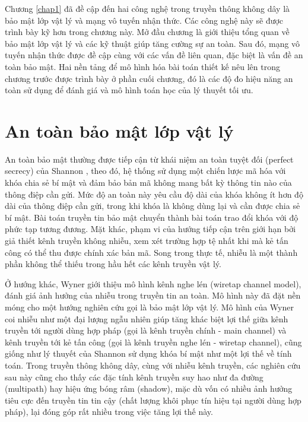 \documentclass[../main.tex]{subfiles}
\begin{document}
\label{chap2}

Chương \ref{chap1} đã đề cập đến hai công nghệ trong truyền thông không dây là bảo mật lớp vật lý và mạng vô tuyến nhận thức. Các công nghệ này sẽ được trình bày kỹ hơn trong chương này. Mở đầu chương là giới thiệu tổng quan về bảo mật lớp vật lý và các kỹ thuật giúp tăng cường sự an toàn. Sau đó, mạng vô tuyến nhận thức được đề cập cùng với các vấn đề liên quan, đặc biệt là vấn đề an toàn bảo mật. Hai nền tảng để mô hình hóa bài toán thiết kế nêu lên trong chương trước được trình bày ở phần cuối chương, đó là các độ đo hiệu năng an toàn sử dụng để đánh giá và mô hình toán học của lý thuyết tối ưu.

\section{An toàn bảo mật lớp vật lý}

An toàn bảo mật thường được tiếp cận từ khái niệm an toàn tuyệt đối (perfect secrecy) của Shannon \cite{shannon}, theo đó, hệ thống sử dụng một chiến lược mã hóa với khóa chia sẻ bí mật và đảm bảo bản mã không mang bất kỳ thông tin nào của thông điệp cần gửi. Mức độ an toàn này yêu cầu độ dài của khóa không ít hơn độ dài của thông điệp cần gửi, trong khi khóa là không dùng lại và cần được chia sẻ bí mật. Bài toán truyền tin bảo mật chuyển thành bài toán trao đổi khóa với độ phức tạp tương đương. Mặt khác, phạm vi của hướng tiếp cận trên giới hạn bởi giả thiết kênh truyền không nhiễu, xem xét trường hợp tệ nhất khi mà kẻ tấn công có thể thu được chính xác bản mã. Song trong thực tế, nhiễu là một thành phần không thể thiếu trong hầu hết các kênh truyền vật lý.

Ở hướng khác, Wyner \cite{wyner} giới thiệu mô hình kênh nghe lén (wiretap channel model), đánh giá ảnh hưởng của nhiễu trong truyền tin an toàn. Mô hình này đã đặt nền móng cho một hướng nghiên cứu gọi là bảo mật lớp vật lý. Mô hình của Wyner coi nhiễu như một đại lượng ngẫu nhiên giúp tăng khác biệt lợi thế giữa kênh truyền tới người dùng hợp pháp (gọi là kênh truyền chính - main channel) và kênh truyền tới kẻ tấn công (gọi là kênh truyền nghe lén - wiretap channel), cũng giống như lý thuyết của Shannon sử dụng khóa bí mật như một lợi thế về tính toán. Trong truyền thông không dây, cùng với nhiễu kênh truyền, các nghiên cứu sau này \cite{liang2008secure,barros2006secrecy,mukherjee2013fading,liang2013broadcast,tang2014secrecy,lin2015fast,lei2015physical} cũng cho thấy các đặc tính kênh truyền suy hao như đa đường (multipath) hay hiệu ứng bóng râm (shadow), mặc dù vốn có nhiều ảnh hưởng tiêu cực đến truyền tin tin cậy (chất lượng khôi phục tín hiệu tại người dùng hợp pháp), lại đóng góp rất nhiều trong việc tăng lợi thế này.
\end{document}
